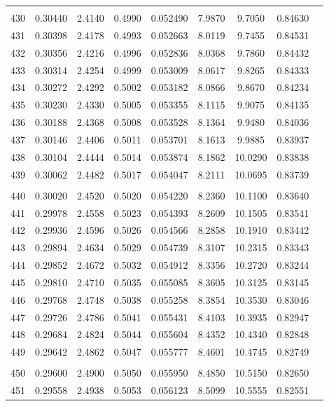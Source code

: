 \documentclass[letter,twosides,10pt]{article}
\begin{document}
\begin{longtable}{|c|c|c|c|c|c|c|c|c|}
 & & & & & & & \\
430 & 0.30440 & 2.4140 & 0.4990 & 0.052490 & 7.9870 &  9.7050 & 0.84630 \\
431 & 0.30398 & 2.4178 & 0.4993 & 0.052663 & 8.0119 &  9.7455 & 0.84531 \\
432 & 0.30356 & 2.4216 & 0.4996 & 0.052836 & 8.0368 &  9.7860 & 0.84432 \\
433 & 0.30314 & 2.4254 & 0.4999 & 0.053009 & 8.0617 &  9.8265 & 0.84333 \\
434 & 0.30272 & 2.4292 & 0.5002 & 0.053182 & 8.0866 &  9.8670 & 0.84234 \\
435 & 0.30230 & 2.4330 & 0.5005 & 0.053355 & 8.1115 &  9.9075 & 0.84135 \\
436 & 0.30188 & 2.4368 & 0.5008 & 0.053528 & 8.1364 &  9.9480 & 0.84036 \\
437 & 0.30146 & 2.4406 & 0.5011 & 0.053701 & 8.1613 &  9.9885 & 0.83937 \\
438 & 0.30104 & 2.4444 & 0.5014 & 0.053874 & 8.1862 & 10.0290 & 0.83838 \\
439 & 0.30062 & 2.4482 & 0.5017 & 0.054047 & 8.2111 & 10.0695 & 0.83739 \\
 & & & & & & & \\
440 & 0.30020 & 2.4520 & 0.5020 & 0.054220 & 8.2360 & 10.1100 & 0.83640 \\
441 & 0.29978 & 2.4558 & 0.5023 & 0.054393 & 8.2609 & 10.1505 & 0.83541 \\
442 & 0.29936 & 2.4596 & 0.5026 & 0.054566 & 8.2858 & 10.1910 & 0.83442 \\
443 & 0.29894 & 2.4634 & 0.5029 & 0.054739 & 8.3107 & 10.2315 & 0.83343 \\
444 & 0.29852 & 2.4672 & 0.5032 & 0.054912 & 8.3356 & 10.2720 & 0.83244 \\
445 & 0.29810 & 2.4710 & 0.5035 & 0.055085 & 8.3605 & 10.3125 & 0.83145 \\
446 & 0.29768 & 2.4748 & 0.5038 & 0.055258 & 8.3854 & 10.3530 & 0.83046 \\
447 & 0.29726 & 2.4786 & 0.5041 & 0.055431 & 8.4103 & 10.3935 & 0.82947 \\
448 & 0.29684 & 2.4824 & 0.5044 & 0.055604 & 8.4352 & 10.4340 & 0.82848 \\
449 & 0.29642 & 2.4862 & 0.5047 & 0.055777 & 8.4601 & 10.4745 & 0.82749 \\
 & & & & & & & \\
450 & 0.29600 & 2.4900 & 0.5050 & 0.055950 & 8.4850 & 10.5150 & 0.82650 \\
451 & 0.29558 & 2.4938 & 0.5053 & 0.056123 & 8.5099 & 10.5555 & 0.82551 \\

\end{longtable}
\end{document}
